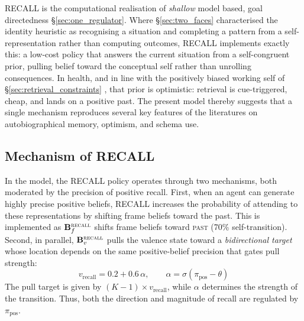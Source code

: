 \documentclass[11pt,a4paper]{article}
\newcommand{\rr}{\color{red!70!black}}
\begin{document}
{\rr RECALL is the computational realisation of \emph{shallow} model based, goal directedness \S\ref{sec:one_regulator}. Where \S\ref{sec:two_faces} characterised the identity heuristic as recognising a situation and completing a pattern from a self-representation rather than computing outcomes, RECALL implements exactly this: a low-cost policy that answers the current situation from a self-congruent prior, pulling belief toward the conceptual self rather than unrolling consequences. In health, and in line with the positively biased working self of \S\ref{sec:retrieval_constraints} \citep{berntsen2009, conwaypleydellpearce2000, conway2005}, that prior is optimistic: retrieval is cue-triggered, cheap, and lands on a positive past. The present model thereby suggests that a single mechanism reproduces several key features of the literatures on autobiographical memory, optimism, and schema use.}

\subsection{Mechanism of RECALL}\label{sec:recall_mechanism}

In the model, the RECALL policy operates through two mechanisms, both moderated by the precision of positive recall. First, when an agent can generate highly precise positive beliefs, RECALL increases the probability of attending to these representations by shifting frame beliefs toward the past. This is implemented as $\mathbf{B}_f^{\textsc{recall}}$ shifts frame beliefs toward \textsc{past} (70\% self-transition). Second, in parallel, $\mathbf{B}_v^{\textsc{recall}}$ pulls the valence state toward a \emph{bidirectional target} whose location depends on the same positive-belief precision that gates pull strength:
\begin{equation}
    v_{\text{recall}} = 0.2 + 0.6\,\alpha, \qquad \alpha = \sigma(\pi_{\text{pos}} - \theta)
\end{equation}
The pull target is given by $(K{-}1) \times v_{\text{recall}}$, while $\alpha$ determines the strength of the transition. Thus, both the direction and magnitude of recall are regulated by $\pi_{\text{pos}}$.
\end{document}
